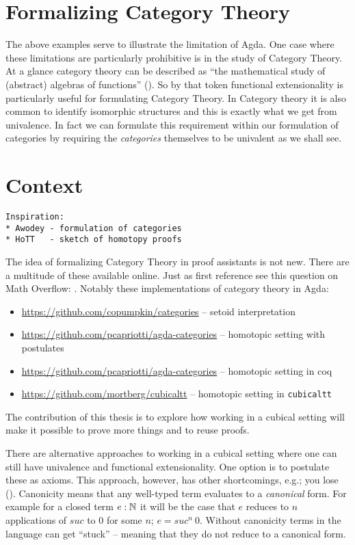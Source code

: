 \section{Formalizing Category Theory}
%
The above examples serve to illustrate the limitation of Agda. One case where
these limitations are particularly prohibitive is in the study of Category
Theory. At a glance category theory can be described as ``the mathematical study
of (abstract) algebras of functions'' (\cite{awodey-2006}). So by that token
functional extensionality is particularly useful for formulating Category
Theory. In Category theory it is also common to identify isomorphic structures
and this is exactly what we get from univalence. In fact we can formulate this
requirement within our formulation of categories by requiring the
\emph{categories} themselves to be univalent as we shall see.

\section{Context}
%
\begin{verbatim}
Inspiration:
* Awodey - formulation of categories
* HoTT   - sketch of homotopy proofs
\end{verbatim}
The idea of formalizing Category Theory in proof assistants is not new. There
are a multitude of these available online. Just as first reference see this
question on Math Overflow: \cite{mo-formalizations}. Notably these
implementations of category theory in Agda:
\begin{itemize}
\item
\url{https://github.com/copumpkin/categories} -- setoid interpretation
\item
\url{https://github.com/pcapriotti/agda-categories} -- homotopic setting with postulates
\item
\url{https://github.com/pcapriotti/agda-categories} -- homotopic setting in coq
\item
\url{https://github.com/mortberg/cubicaltt} -- homotopic setting in \texttt{cubicaltt}
\end{itemize}

The contribution of this thesis is to explore how working in a cubical setting
will make it possible to prove more things and to reuse proofs.

There are alternative approaches to working in a cubical setting where one can
still have univalence and functional extensionality. One option is to postulate
these as axioms. This approach, however, has other shortcomings, e.g.; you lose
 (\cite{huber-2016}). Canonicity means that any well-typed
term evaluates to a \emph{canonical} form. For example for a closed term $e :
\mathbb{N}$ it will be the case that $e$ reduces to $n$ applications of $\mathit{suc}$
to $0$ for some $n$; $e = \mathit{suc}^n\ 0$. Without canonicity terms in the
language can get ``stuck'' -- meaning that they do not reduce to a canonical
form.

